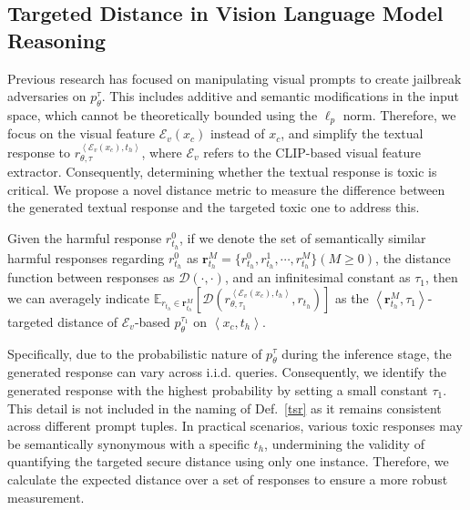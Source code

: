 \subsection{Targeted Distance in Vision Language Model Reasoning}
Previous research has focused on manipulating visual prompts to create jailbreak adversaries on $p_{\theta}^{\tau}$. This includes additive and semantic modifications in the input space, which cannot be theoretically bounded using the $\ell_p$ norm. Therefore, we focus on the visual feature $\mathcal{E}_v(x_c)$ instead of $x_c$, and simplify the textual response to $r_{\theta, \tau}^{\left<\mathcal{E}_v(x_c), t_h\right>}$, where $\mathcal{E}_v$ refers to the CLIP-based visual feature extractor. Consequently, determining whether the textual response is toxic is critical. We propose a novel distance metric to measure the difference between the generated textual response and the targeted toxic one to address this.
\begin{definition}
\label{tsr}
Given the harmful response $r_{t_h}^{0}$, if we denote the set of semantically similar harmful responses regarding $r_{t_h}^0$ as $\mathbf{r}_{t_h}^{M} = \{r_{t_h}^0, r_{t_h}^1, \cdots, r_{t_h}^M\}$$(M\geq0)$, the distance function between responses as $\mathcal{D}(\cdot, \cdot)$, and an infinitesimal constant as $\tau_1$, then we can averagely indicate $\mathbb{E}_{r_{t_h}\in\mathbf{r}_{t_h}^M}[\mathcal{D}(r_{\theta, \tau_1}^{\left<\mathcal{E}_v(x_c), t_h\right>}, r_{t_h})]$ as the $\left<\mathbf{r}_{t_h}^M, \tau_1\right>$-targeted distance of $\mathcal{E}_v$-based $p_{\theta}^{\tau_1}$ on $\left<x_c, t_h\right>$.
\end{definition}
Specifically, due to the probabilistic nature of $p_{\theta}^{\tau}$ during the inference stage, the generated response can vary across i.i.d. queries. Consequently, we identify the generated response with the highest probability by setting a small constant $\tau_1$. This detail is not included in the naming of Def.~\ref{tsr} as it remains consistent across different prompt tuples. In practical scenarios, various toxic responses may be semantically synonymous with a specific $t_h$, undermining the validity of quantifying the targeted secure distance using only one instance. Therefore, we calculate the expected distance over a set of responses to ensure a more robust measurement.

